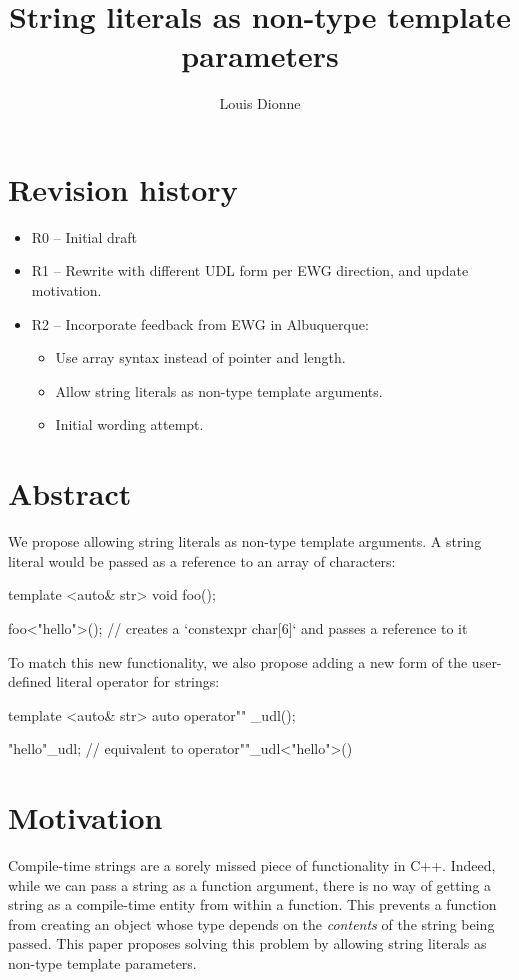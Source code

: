 \documentclass{wg21}
\title{String literals as non-type template parameters}
\author{Louis Dionne}{ldionne.2@gmail.com}
\begin{document}
\maketitle


\section{Revision history}
\begin{itemize}
  \item R0 -- Initial draft
  \item R1 -- Rewrite with different UDL form per EWG direction, and update motivation.
  \item R2 -- Incorporate feedback from EWG in Albuquerque:
              \begin{itemize}
                \item Use array syntax instead of pointer and length.
                \item Allow string literals as non-type template arguments.
                \item Initial wording attempt.
              \end{itemize}
\end{itemize}


\section{Abstract}
We propose allowing string literals as non-type template arguments. A string
literal would be passed as a reference to an array of characters:

\begin{cpp}
template <auto& str>
void foo();

foo<"hello">(); // creates a `constexpr char[6]` and passes a reference to it
\end{cpp}

To match this new functionality, we also propose adding a new form of the
user-defined literal operator for strings:

\begin{cpp}
template <auto& str>
auto operator"" _udl();

"hello"_udl; // equivalent to operator""_udl<"hello">()
\end{cpp}


\section{Motivation}
Compile-time strings are a sorely missed piece of functionality in C++.
Indeed, while we can pass a string as a function argument, there is no way
of getting a string as a compile-time entity from within a function. This
prevents a function from creating an object whose type depends on the
\emph{contents} of the string being passed. This paper proposes solving
this problem by allowing string literals as non-type template parameters.
\end{document}
